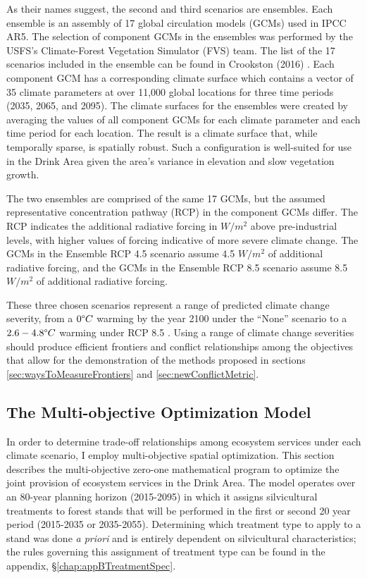 As their names suggest, the second and third scenarios are ensembles. Each ensemble is an assembly of 17 global circulation models (GCMs) used in IPCC AR5. The selection of component GCMs in the ensembles was performed by the USFS's Climate-Forest Vegetation Simulator (FVS) \cite{dixon2002essential} team. The list of the 17 scenarios included in the ensemble can be found in Crookston (2016) \cite{ClimateModelsInFVSEnsemble}. Each component GCM has a corresponding climate surface which contains a vector of 35 climate parameters at over 11,000 global locations for three time periods (2035, 2065, and 2095). The climate surfaces for the ensembles were created by averaging the values of all component GCMs for each climate parameter and each time period for each location. The result is a climate surface that, while temporally sparse, is spatially robust. Such a configuration is well-suited for use in the Drink Area given the area's variance in elevation and slow vegetation growth.

The two ensembles are comprised of the same 17 GCMs, but the assumed representative concentration pathway (RCP) in the component GCMs differ. The RCP indicates the additional radiative forcing in $W/m^2$ above pre-industrial levels, with higher values of forcing indicative of more severe climate change. The GCMs in the Ensemble RCP 4.5 scenario assume 4.5 $W/m^2$ of additional radiative forcing, and the GCMs in the Ensemble RCP 8.5 scenario assume 8.5 $W/m^2$ of additional radiative forcing.

These three chosen scenarios represent a range of predicted climate change severity, from a $0 \degree C$ warming by the year 2100 under the ``None'' scenario to a $2.6-4.8 \degree C$ warming under RCP 8.5 \cite{ipcc2013climate}. Using a range of climate change severities should produce efficient frontiers and conflict relationships among the objectives that allow for the demonstration of the methods proposed in sections \ref{sec:waysToMeasureFrontiers} and \ref{sec:newConflictMetric}.

\subsection{The Multi-objective Optimization Model}
\label{sec:model}
In order to determine trade-off relationships among ecosystem services under each climate scenario, I employ multi-objective spatial optimization. This section describes the multi-objective zero-one mathematical program to optimize the joint provision of ecosystem services in the Drink Area. The model operates over an 80-year planning horizon (2015-2095) in which it assigns silvicultural treatments to forest stands that will be performed in the first or second 20 year period (2015-2035 or 2035-2055). Determining which treatment type to apply to a stand was done \textit{a priori} and is entirely dependent on silvicultural characteristics; the rules governing this assignment of treatment type can be found in the appendix, \S \ref{chap:appBTreatmentSpec}.


